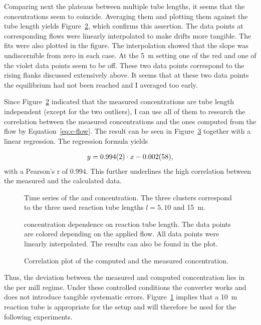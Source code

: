Comparing next the  plateaus between multiple tube lengths, it
seems that the concentrations seem to coincide. Averaging them and
plotting them against the tube length yields
Figure~\ref{fig:no-length}, which confirms this assertion. The data
points at corresponding flows were linearly interpolated to make
drifts more tangible. The fits were also plotted in the figure. The
interpolation showed that the slope was undiscernible from zero in
each case. At the \SI{5}{\meter} setting one of the red and one of the
violet data points seem to be off. These two data points correspond to
the rising flanks discussed extensively above. It seems that at these
two data points the equilibrium had not been reached and I averaged
too early.

Since Figure~\ref{fig:no-length} indicated that the measured
concentrations are tube length independent (except for the two
outliers), I can use all of them to research the correlation between
the measured concentrations and the ones computed from the flow by
Equation~\eqref{eq:c-flow}. The result can be seen in
Figure~\ref{fig:no-calib} together with a linear regression. The
regression formula yields

\begin{align*}
  y = \num{0.994 \pm 0.002}  \cdot x -\num{0.002 \pm 0.058},
\end{align*}
with a Pearson's r of 0.994. This further underlines the high
correlation between the measured and the calculated data.
\begin{figure}[htbp]
  \centering
  
  \hfill
  
  \caption{Time series of the  and  concentration. The
    three clusters correspond to the three used reaction tube lengths
    $l = 5, 10$ and \SI{15}{\meter}.}
  \label{fig:ts}
\end{figure}
\begin{figure}[htbp]
  \centering
  
  \caption{ concentration dependence on reaction tube
    length. The data points are colored depending on the applied
     flow. All data points were linearly interpolated. The
    results can also be found in the plot.}
  \label{fig:no-length}
\end{figure}

\begin{figure}[htbp]
  \centering
  
  \caption{Correlation plot of the computed and the measured 
    concentration.}
  \label{fig:no-calib}
\end{figure}

Thus, the deviation between the measured and computed concentration
lies in the per mill regime. Under these controlled conditions the
converter works and does not introduce tangible systematic
errors. Figure~\ref{fig:ts} implies that a \SI{10}{\meter} reaction
tube is appropriate for the setup and will therefore be used for the
following experiments.

